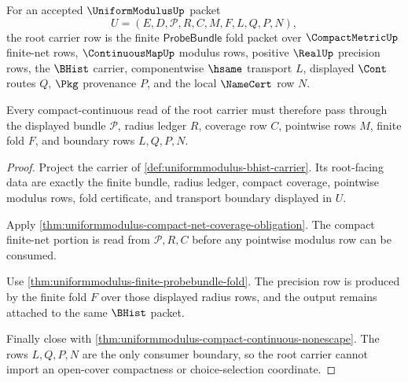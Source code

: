 \begin{theorem}
\label{thm:uniformmodulus-root-carrier-row}
For an accepted $\UniformModulusUp$ packet
$$
U=(E,D,\mathcal{P},R,C,M,F,L,Q,P,N),
$$
the root carrier row is the finite $\mathsf{ProbeBundle}$ fold packet over $\CompactMetricUp$ finite-net rows, $\ContinuousMapUp$ modulus rows, positive $\RealUp$ precision rows, the $\BHist$ carrier, componentwise $\hsame$ transport $L$, displayed $\Cont$ routes $Q$, $\Pkg$ provenance $P$, and the local $\NameCert$ row $N$.

Every compact-continuous read of the root carrier must therefore pass through the displayed bundle $\mathcal{P}$, radius ledger $R$, coverage row $C$, pointwise rows $M$, finite fold $F$, and boundary rows $L,Q,P,N$.
\end{theorem}
\begin{proof}
Project the carrier of \autoref{def:uniformmodulus-bhist-carrier}. Its root-facing data are exactly the finite bundle, radius ledger, compact coverage, pointwise modulus rows, fold certificate, and transport boundary displayed in $U$.

Apply \autoref{thm:uniformmodulus-compact-net-coverage-obligation}. The compact finite-net portion is read from $\mathcal{P},R,C$ before any pointwise modulus row can be consumed.

Use \autoref{thm:uniformmodulus-finite-probebundle-fold}. The precision row is produced by the finite fold $F$ over those displayed radius rows, and the output remains attached to the same $\BHist$ packet.

Finally close with \autoref{thm:uniformmodulus-compact-continuous-nonescape}. The rows $L,Q,P,N$ are the only consumer boundary, so the root carrier cannot import an open-cover compactness or choice-selection coordinate.
\end{proof}

